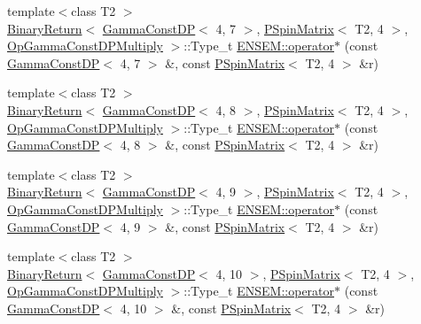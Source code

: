 \begin{DoxyCompactItemize}
\item 
{\footnotesize template$<$class T2 $>$ }\\\mbox{\hyperlink{structENSEM_1_1BinaryReturn}{Binary\+Return}}$<$ \mbox{\hyperlink{classENSEM_1_1GammaConstDP}{Gamma\+Const\+DP}}$<$ 4, 7 $>$, \mbox{\hyperlink{classENSEM_1_1PSpinMatrix}{P\+Spin\+Matrix}}$<$ T2, 4 $>$, \mbox{\hyperlink{structENSEM_1_1OpGammaConstDPMultiply}{Op\+Gamma\+Const\+D\+P\+Multiply}} $>$\+::Type\+\_\+t \mbox{\hyperlink{group__primspinmatrix_ga2c4f08577a26616df666f15bc0a836e8}{E\+N\+S\+E\+M\+::operator$\ast$}} (const \mbox{\hyperlink{classENSEM_1_1GammaConstDP}{Gamma\+Const\+DP}}$<$ 4, 7 $>$ \&, const \mbox{\hyperlink{classENSEM_1_1PSpinMatrix}{P\+Spin\+Matrix}}$<$ T2, 4 $>$ \&r)
\item 
{\footnotesize template$<$class T2 $>$ }\\\mbox{\hyperlink{structENSEM_1_1BinaryReturn}{Binary\+Return}}$<$ \mbox{\hyperlink{classENSEM_1_1GammaConstDP}{Gamma\+Const\+DP}}$<$ 4, 8 $>$, \mbox{\hyperlink{classENSEM_1_1PSpinMatrix}{P\+Spin\+Matrix}}$<$ T2, 4 $>$, \mbox{\hyperlink{structENSEM_1_1OpGammaConstDPMultiply}{Op\+Gamma\+Const\+D\+P\+Multiply}} $>$\+::Type\+\_\+t \mbox{\hyperlink{group__primspinmatrix_ga15c8807596a50758b2f396f050d763c8}{E\+N\+S\+E\+M\+::operator$\ast$}} (const \mbox{\hyperlink{classENSEM_1_1GammaConstDP}{Gamma\+Const\+DP}}$<$ 4, 8 $>$ \&, const \mbox{\hyperlink{classENSEM_1_1PSpinMatrix}{P\+Spin\+Matrix}}$<$ T2, 4 $>$ \&r)
\item 
{\footnotesize template$<$class T2 $>$ }\\\mbox{\hyperlink{structENSEM_1_1BinaryReturn}{Binary\+Return}}$<$ \mbox{\hyperlink{classENSEM_1_1GammaConstDP}{Gamma\+Const\+DP}}$<$ 4, 9 $>$, \mbox{\hyperlink{classENSEM_1_1PSpinMatrix}{P\+Spin\+Matrix}}$<$ T2, 4 $>$, \mbox{\hyperlink{structENSEM_1_1OpGammaConstDPMultiply}{Op\+Gamma\+Const\+D\+P\+Multiply}} $>$\+::Type\+\_\+t \mbox{\hyperlink{group__primspinmatrix_gab9e77cb7fcc24e0d8f81fc43b3274d5d}{E\+N\+S\+E\+M\+::operator$\ast$}} (const \mbox{\hyperlink{classENSEM_1_1GammaConstDP}{Gamma\+Const\+DP}}$<$ 4, 9 $>$ \&, const \mbox{\hyperlink{classENSEM_1_1PSpinMatrix}{P\+Spin\+Matrix}}$<$ T2, 4 $>$ \&r)
\item 
{\footnotesize template$<$class T2 $>$ }\\\mbox{\hyperlink{structENSEM_1_1BinaryReturn}{Binary\+Return}}$<$ \mbox{\hyperlink{classENSEM_1_1GammaConstDP}{Gamma\+Const\+DP}}$<$ 4, 10 $>$, \mbox{\hyperlink{classENSEM_1_1PSpinMatrix}{P\+Spin\+Matrix}}$<$ T2, 4 $>$, \mbox{\hyperlink{structENSEM_1_1OpGammaConstDPMultiply}{Op\+Gamma\+Const\+D\+P\+Multiply}} $>$\+::Type\+\_\+t \mbox{\hyperlink{group__primspinmatrix_gad3aa1e55d31246f4c4f0a15456a84fea}{E\+N\+S\+E\+M\+::operator$\ast$}} (const \mbox{\hyperlink{classENSEM_1_1GammaConstDP}{Gamma\+Const\+DP}}$<$ 4, 10 $>$ \&, const \mbox{\hyperlink{classENSEM_1_1PSpinMatrix}{P\+Spin\+Matrix}}$<$ T2, 4 $>$ \&r)

\end{DoxyCompactItemize}
